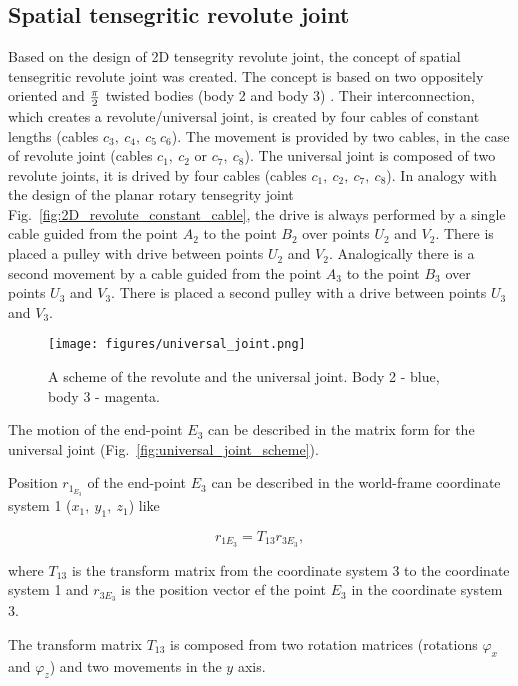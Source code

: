 \documentclass{article}
\begin{document}
\subsection{Spatial tensegritic revolute joint}

Based on the design of 2D tensegrity revolute joint, the concept of spatial tensegritic revolute joint was created. The concept is based on two oppositely oriented and $\pi \over 2$ twisted bodies (body 2 and body 3) . Their interconnection, which creates a revolute/universal joint, is created by four cables of constant lengths (cables $c_3,\ c_4,\ c_5\ c_6$). The movement is provided by two cables, in the case of revolute joint (cables $c_1,\ c_2$ or $c_7,\ c_8$). The universal joint is composed of two revolute joints, it is drived by four cables (cables $c_1,\ c_2,\ c_7,\ c_8$). In analogy with the design of the planar rotary tensegrity joint Fig.~\ref{fig:2D_revolute_constant_cable}, the drive is always performed by a single cable guided from the point $A_2$ to the point $B_2$ over points $U_2$ and $V_2$. There is placed a pulley with drive between points $U_2$ and $V_2$. Analogically there is a second movement by a cable guided from the point $A_3$ to the point $B_3$ over points $U_3$ and $V_3$. There is placed a second pulley with a drive between points $U_3$ and $V_3$.

\begin{figure}[h!]
    \centering
    \texttt{[image: figures/universal\_joint.png]}
    \caption{A scheme of the revolute and the universal joint. Body 2 - blue, body 3 - magenta.}
    \label{fig:revolute_universal_joint}
\end{figure}

The motion of the end-point $E_3$ can be described in the matrix form for the universal joint (Fig.~\ref{fig:universal_joint_scheme}).

Position $r_{1_{E_3}}$ of the end-point $E_3$ can be described in the world-frame coordinate system 1 ($x_1,\ y_1,\ z_1$) like

\begin{equation}
    r_{1{E_3}} = T_{13} r_{3{E_3}},
\end{equation}

where $T_{13}$ is the transform matrix from the coordinate system 3 to the coordinate system 1 and $r_{3{E_3}}$ is the position vector ef the point $E_3$ in the coordinate system 3.

The transform matrix $T_{13}$ is composed from two rotation matrices (rotations $\varphi_x$ and $\varphi_z$) and two movements in the $y$ axis.
\end{document}
